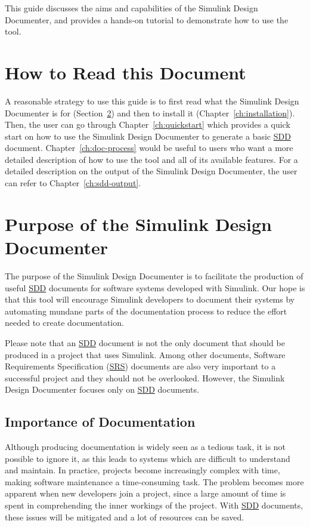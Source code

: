 \documentclass{mcscert}
\newcommand{\simulink}{Simulink}
\newcommand{\sddtool}{Simulink Design Documenter}
\begin{document}
This guide discusses the aims and capabilities of the \sddtool{}, 
and provides a hands-on tutorial to demonstrate how to use the tool.

\section{How to Read this Document}
A reasonable strategy to use this guide is to first read what the \sddtool{} is 
for (Section~\ref{sec:tool-purpose}) and then to install it (Chapter~\ref{ch:installation}).
Then, the user can go through Chapter~\ref{ch:quickstart} which provides a 
quick start on how to use the \sddtool{} to generate a basic \hyperref[acr:sdd]{SDD} document. 
Chapter~\ref{ch:doc-process} would be useful to users who want a more detailed 
description of how to use the tool and all of its available features. 
For a detailed description on the output of the \sddtool{}, 
the user can refer to Chapter~\ref{ch:sdd-output}.

\section{Purpose of the \sddtool{}} 
\label{sec:tool-purpose}
The purpose of the \sddtool{} is to facilitate the production of useful 
\hyperref[acr:sdd]{SDD} documents for software systems developed with 
\simulink{}.
Our hope is that this tool will encourage \simulink{} developers to document 
their systems by automating mundane parts of the documentation process to reduce
the effort needed to create documentation.

Please note that an \hyperref[acr:sdd]{SDD} document is not the only document 
that should be produced in a project that uses \simulink{}. 
Among other documents, Software Requirements Specification 
(\hyperref[acr:srs]{SRS}) documents are also very important to a successful 
project and they should not be overlooked. 
However, the \sddtool{} focuses only on \hyperref[acr:sdd]{SDD} documents.
  
\subsection{Importance of Documentation}
Although producing documentation is widely seen as a tedious task, 
it is not possible to ignore it, as this leads to systems which are difficult to
understand and maintain. 
In practice, projects become increasingly complex with time, making software 
maintenance a time-consuming task. 
The problem becomes more apparent when new developers join a project, since a 
large amount of time is spent in comprehending the inner workings of the 
project. 
With \hyperref[acr:sdd]{SDD} documents, these issues will be mitigated and a lot
of resources can be saved.
    
\end{document}
